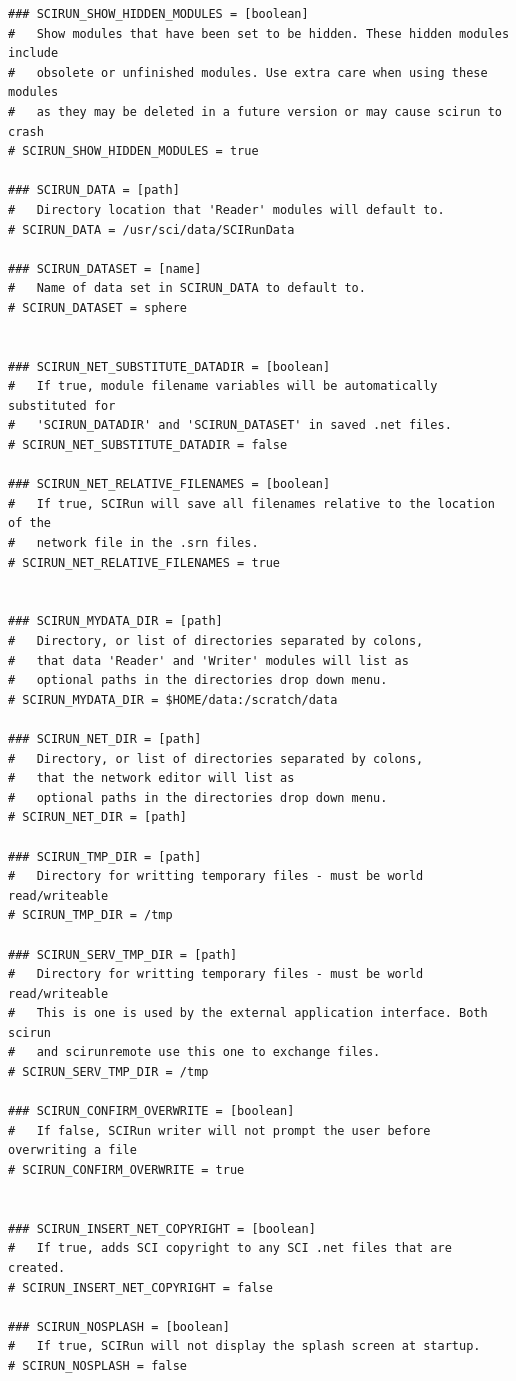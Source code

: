 \documentclass[fleqn,12pt,openany]{book}
\begin{document}
\begin{verbatim}
### SCIRUN_SHOW_HIDDEN_MODULES = [boolean]
#   Show modules that have been set to be hidden. These hidden modules include
#   obsolete or unfinished modules. Use extra care when using these modules
#   as they may be deleted in a future version or may cause scirun to crash
# SCIRUN_SHOW_HIDDEN_MODULES = true

### SCIRUN_DATA = [path]
#   Directory location that 'Reader' modules will default to.
# SCIRUN_DATA = /usr/sci/data/SCIRunData

### SCIRUN_DATASET = [name]
#   Name of data set in SCIRUN_DATA to default to.
# SCIRUN_DATASET = sphere


### SCIRUN_NET_SUBSTITUTE_DATADIR = [boolean]
#   If true, module filename variables will be automatically substituted for
#   'SCIRUN_DATADIR' and 'SCIRUN_DATASET' in saved .net files.
# SCIRUN_NET_SUBSTITUTE_DATADIR = false

### SCIRUN_NET_RELATIVE_FILENAMES = [boolean]
#   If true, SCIRun will save all filenames relative to the location of the 
#   network file in the .srn files.
# SCIRUN_NET_RELATIVE_FILENAMES = true


### SCIRUN_MYDATA_DIR = [path]
#   Directory, or list of directories separated by colons, 
#   that data 'Reader' and 'Writer' modules will list as
#   optional paths in the directories drop down menu.
# SCIRUN_MYDATA_DIR = $HOME/data:/scratch/data

### SCIRUN_NET_DIR = [path]
#   Directory, or list of directories separated by colons, 
#   that the network editor will list as
#   optional paths in the directories drop down menu.
# SCIRUN_NET_DIR = [path]

### SCIRUN_TMP_DIR = [path]
#   Directory for writting temporary files - must be world read/writeable
# SCIRUN_TMP_DIR = /tmp

### SCIRUN_SERV_TMP_DIR = [path]
#   Directory for writting temporary files - must be world read/writeable
#   This is one is used by the external application interface. Both scirun
#   and scirunremote use this one to exchange files.
# SCIRUN_SERV_TMP_DIR = /tmp

### SCIRUN_CONFIRM_OVERWRITE = [boolean]
#   If false, SCIRun writer will not prompt the user before overwriting a file
# SCIRUN_CONFIRM_OVERWRITE = true


### SCIRUN_INSERT_NET_COPYRIGHT = [boolean]
#   If true, adds SCI copyright to any SCI .net files that are created.
# SCIRUN_INSERT_NET_COPYRIGHT = false

### SCIRUN_NOSPLASH = [boolean]
#   If true, SCIRun will not display the splash screen at startup.
# SCIRUN_NOSPLASH = false



\end{verbatim}
\end{document}
